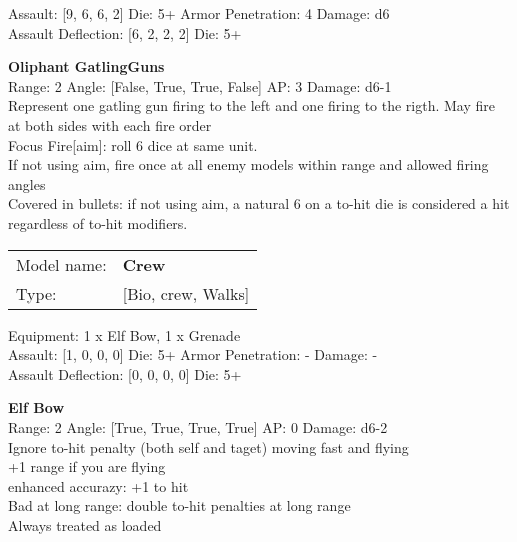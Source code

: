 Assault: [9, 6, 6, 2] Die: 5+ Armor Penetration: 4 Damage: d6 \\
Assault Deflection: [6, 2, 2, 2] Die: 5+\\
\indent  



{\bf Oliphant GatlingGuns } \\



Range: 2  Angle: [False, True, True, False] AP: 3 Damage: d6-1 \\
Represent one gatling gun firing to the left and one firing to the rigth. May fire at both sides with each fire order\\ 
Focus Fire[aim]: roll 6 dice at same unit.\\ 
If not using aim, fire once at all enemy models within range and allowed firing angles\\ 
Covered in bullets: if not using aim, a natural 6 on a to-hit die is considered a hit regardless of to-hit modifiers.\\ 




 



\begin{tabular}{ll}
Model name: & {\bf Crew } \\
Type: & [Bio, crew, Walks] \\
\end{tabular}

Equipment: 1 x Elf Bow, 1 x Grenade \\

Assault: [1, 0, 0, 0] Die: 5+ Armor Penetration: - Damage: - \\
Assault Deflection: [0, 0, 0, 0] Die: 5+\\
\indent  



{\bf Elf Bow } \\



Range: 2  Angle: [True, True, True, True] AP: 0 Damage: d6-2 \\
Ignore to-hit penalty (both self and taget) moving fast and flying\\ 
+1 range if you are flying\\ 
enhanced accurazy: +1 to hit\\ 
Bad at long range: double to-hit penalties at long range\\ 
Always treated as loaded\\ 




